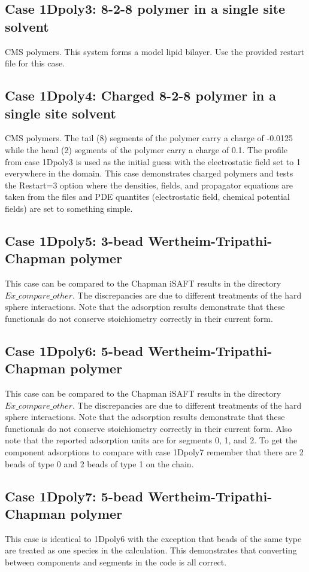 \documentclass[10pt,onecolumn]{article}
\begin{document}
\subsection{Case 1Dpoly3:  8-2-8 polymer in a single site solvent}
CMS polymers. This system forms a model lipid bilayer.  Use the provided restart file for this case.

\subsection{Case 1Dpoly4: Charged 8-2-8 polymer in a single site solvent}
CMS polymers. The tail (8) segments of the polymer carry a charge of -0.0125 while the
head (2) segments of the polymer carry a charge of 0.1.  The profile from
case 1Dpoly3 is used as the initial guess with the electrostatic field set to 1 everywhere in the 
domain.  This case demonstrates charged polymers and tests the Restart=3 option
where the densities, fields, and propagator equations are taken from the files and
PDE quantites (electrostatic field, chemical potential fields) are set to something
simple.

\subsection{Case 1Dpoly5: 3-bead Wertheim-Tripathi-Chapman polymer}
This case can be compared to the Chapman iSAFT results in the directory $Ex\_compare\_other$.  The discrepancies are due to different treatments of the hard sphere interactions.  Note that the adsorption results demonstrate that these functionals do not conserve stoichiometry correctly in their current form. 

\subsection{Case 1Dpoly6: 5-bead Wertheim-Tripathi-Chapman polymer}
This case can be compared to the Chapman iSAFT results in the directory $Ex\_compare\_other$.  The discrepancies are due to different treatments of the hard sphere interactions.  Note that the adsorption results demonstrate that these functionals do not conserve stoichiometry correctly in their current form.  Also note that the reported adsorption units are for segments 0, 1, and 2. To get the component adsorptions to compare with case 1Dpoly7 remember that there are 2 beads of type 0 and 2 beads of type 1 on the chain.

\subsection{Case 1Dpoly7: 5-bead Wertheim-Tripathi-Chapman polymer}
This case is identical to 1Dpoly6 with the exception that beads of the same type are treated as one species in the calculation.  This demonstrates that converting between components and segments in the code is all correct.  
\end{document}

